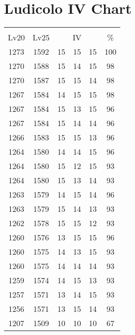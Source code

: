 \documentclass{article}%
\begin{document}
%
\normalsize%
\section{Ludicolo IV Chart}%
\label{sec:Ludicolo IV Chart}%
\renewcommand{\arraystretch}{1.5}%
\begin{tabular}{|c|c|c|c|c|c|}%
\hline%
\multicolumn{6}{|c|}{\textcolor{white}{ 
\linebreak{Ludicolo}
}%
\cellcolor{black}}\\%
\multicolumn{1}{|c}{Lv20}&\multicolumn{1}{c|}{Lv25}&\multicolumn{3}{c|}{IV}&\multicolumn{1}{|c|}{\%}\\%
\hline%
\rowcolor{color100}%
1273&1592&15&15&15&100\\%
\hline%
\rowcolor{color98}%
1270&1588&15&14&15&98\\%
\hline%
\rowcolor{color98}%
1270&1587&15&15&14&98\\%
\hline%
\rowcolor{color98}%
1267&1584&14&15&15&98\\%
\hline%
\rowcolor{color96}%
1267&1584&15&13&15&96\\%
\hline%
\rowcolor{color96}%
1267&1584&15&14&14&96\\%
\hline%
\rowcolor{color96}%
1266&1583&15&15&13&96\\%
\hline%
\rowcolor{color96}%
1264&1580&14&14&15&96\\%
\hline%
\rowcolor{color93}%
1264&1580&15&12&15&93\\%
\hline%
\rowcolor{color93}%
1264&1580&15&13&14&93\\%
\hline%
\rowcolor{color96}%
1263&1579&14&15&14&96\\%
\hline%
\rowcolor{color93}%
1263&1579&15&14&13&93\\%
\hline%
\rowcolor{color93}%
1262&1578&15&15&12&93\\%
\hline%
\rowcolor{color96}%
1260&1576&13&15&15&96\\%
\hline%
\rowcolor{color93}%
1260&1575&14&13&15&93\\%
\hline%
\rowcolor{color93}%
1260&1575&14&14&14&93\\%
\hline%
\rowcolor{color93}%
1259&1574&14&15&13&93\\%
\hline%
\rowcolor{color93}%
1257&1571&13&14&15&93\\%
\hline%
\rowcolor{color93}%
1256&1571&13&15&14&93\\%
\hline%
\rowcolor{color91}%
1207&1509&10&10&10&67\\%
\end{tabular}

%
\end{document}
